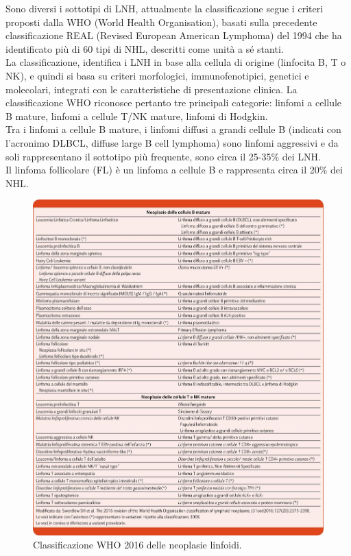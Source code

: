 Sono diversi i sottotipi di LNH, attualmente la classificazione segue i criteri proposti dalla WHO 
(World Health Organisation), basati sulla precedente classificazione REAL (Revised European American Lymphoma) 
del 1994 che ha identificato più di 60 tipi di NHL, descritti come unità a sé stanti\cite{AIOM}.\\
La classificazione, identifica i LNH in base alla cellula di origine (linfocita B, T o NK), e quindi si basa su 
criteri morfologici, immunofenotipici, genetici e molecolari, integrati con le caratteristiche di presentazione clinica. 
La classificazione WHO riconosce pertanto tre principali categorie: linfomi a cellule B mature, linfomi a cellule T/NK
mature, linfomi di Hodgkin\cite{AIOM}.\\
Tra i linfomi a cellule B mature, i linfomi diffusi a grandi cellule B (indicati con l’acronimo DLBCL, 
diffuse large B cell lymphoma) sono linfomi aggressivi e da soli rappresentano il sottotipo più frequente, 
sono circa il 25-35\% dei LNH\cite{AIOM}.\\
Il linfoma follicolare (FL) è un linfoma a cellule B e rappresenta circa il 20\% dei NHL.\\

\begin{figure}[h]
    \begin{center}
    \includegraphics[width=1.125\columnwidth]{img/CLASS.WHO.jpeg}
    \end{center}
    \caption[Classificazione WHO 2016 delle neoplasie linfoidi.]{Classificazione WHO 2016 delle neoplasie linfoidi.
    \cite{img15}}

\end{figure}

